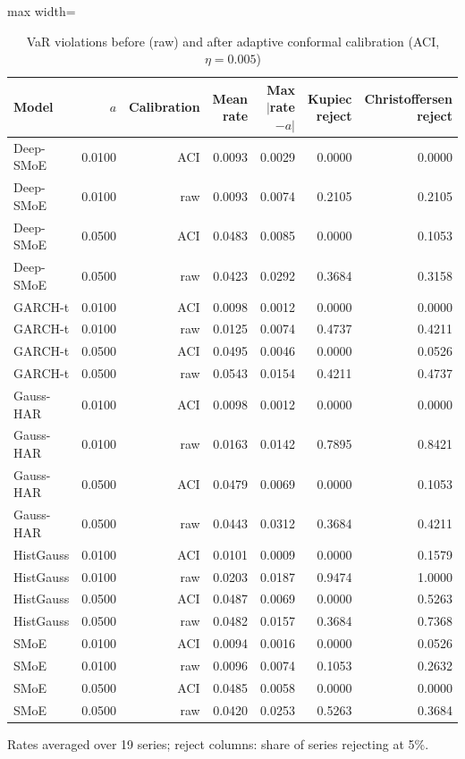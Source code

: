 \begin{table}[!htbp]\centering\scriptsize
\caption{VaR violations before (raw) and after adaptive conformal calibration (ACI, $\eta=0.005$)}\label{tab:conformal}
\begin{adjustbox}{max width=\textwidth}
\begin{tabular}{lrrrrrr}
\toprule
Model & $a$ & Calibration & Mean rate & Max $|$rate$-a|$ & Kupiec reject & Christoffersen reject\\
\midrule
Deep-SMoE & 0.0100 & ACI & 0.0093 & 0.0029 & 0.0000 & 0.0000\\
Deep-SMoE & 0.0100 & raw & 0.0093 & 0.0074 & 0.2105 & 0.2105\\
Deep-SMoE & 0.0500 & ACI & 0.0483 & 0.0085 & 0.0000 & 0.1053\\
Deep-SMoE & 0.0500 & raw & 0.0423 & 0.0292 & 0.3684 & 0.3158\\
GARCH-t & 0.0100 & ACI & 0.0098 & 0.0012 & 0.0000 & 0.0000\\
GARCH-t & 0.0100 & raw & 0.0125 & 0.0074 & 0.4737 & 0.4211\\
GARCH-t & 0.0500 & ACI & 0.0495 & 0.0046 & 0.0000 & 0.0526\\
GARCH-t & 0.0500 & raw & 0.0543 & 0.0154 & 0.4211 & 0.4737\\
Gauss-HAR & 0.0100 & ACI & 0.0098 & 0.0012 & 0.0000 & 0.0000\\
Gauss-HAR & 0.0100 & raw & 0.0163 & 0.0142 & 0.7895 & 0.8421\\
Gauss-HAR & 0.0500 & ACI & 0.0479 & 0.0069 & 0.0000 & 0.1053\\
Gauss-HAR & 0.0500 & raw & 0.0443 & 0.0312 & 0.3684 & 0.4211\\
HistGauss & 0.0100 & ACI & 0.0101 & 0.0009 & 0.0000 & 0.1579\\
HistGauss & 0.0100 & raw & 0.0203 & 0.0187 & 0.9474 & 1.0000\\
HistGauss & 0.0500 & ACI & 0.0487 & 0.0069 & 0.0000 & 0.5263\\
HistGauss & 0.0500 & raw & 0.0482 & 0.0157 & 0.3684 & 0.7368\\
SMoE & 0.0100 & ACI & 0.0094 & 0.0016 & 0.0000 & 0.0526\\
SMoE & 0.0100 & raw & 0.0096 & 0.0074 & 0.1053 & 0.2632\\
SMoE & 0.0500 & ACI & 0.0485 & 0.0058 & 0.0000 & 0.0000\\
SMoE & 0.0500 & raw & 0.0420 & 0.0253 & 0.5263 & 0.3684\\
\bottomrule
\end{tabular}
\end{adjustbox}
\par\smallskip\begin{minipage}{\textwidth}\footnotesize
Rates averaged over 19 series; reject columns: share of series rejecting at 5\%.
\end{minipage}
\end{table}